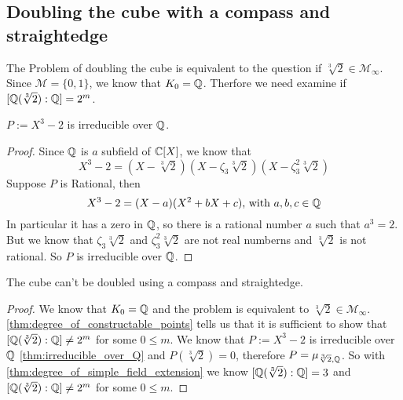 \documentclass{../Proof_layout_PDF/TemplateExercise}
\begin{document}
\subsection{Doubling the cube with a compass and straightedge}
The Problem of doubling the cube is equivalent to the question if $\sqrt[3]{2} \in \mathcal{M}_{\infty}$.
Since $\mathcal{M} = \{0,1\}$, we know that $K_0 = \mathbb{Q}$. Therfore we need examine if $[\mathbb{Q}(\sqrt[3]{2}):\mathbb{Q}] = 2^m$.

\begin{theorem}
    $P := X^3 - 2$ is irreducible over $\mathbb{Q}$.
\label{thm:irreducible_over_Q}
\end{theorem}
\begin{proof}
    Since $\mathbb{Q}$ is $a$ subfield of $\mathbb{C} [X]$, we know that
    \begin{equation*}
        X^3 - 2 = (X - \sqrt[3]{2})(X -\zeta_3 \sqrt[3]{2})(X -\zeta_3^2 \sqrt[3]{2})
    \end{equation*}
    Suppose $P$ is Rational, then
    \begin{equation*}
        X^3 - 2 = (X - a)(X^2 + bX + c)\text{, with } a, b, c \in \mathbb{Q}
    \end{equation*}
    In particular it has a zero in $\mathbb{Q}$, so there is a rational number $a$ such that $a^3 = 2$.\newline
    But we know that $\zeta_3 \sqrt[3]{2}$ and $\zeta_3^2 \sqrt[3]{2}$ are not real numberns and $\sqrt[3]{2}$ is not rational.
    So $P$ is irreducible over $\mathbb{Q}$.
\end{proof}
\begin{theorem}
    The cube can't be doubled using a compass and straightedge.
\end{theorem}
\begin{proof}
    We know that $K_0 = \mathbb{Q}$ and the problem is equivalent to $\sqrt[3]{2} \in \mathcal{M}_{\infty}$.\newline
    \ref{thm:degree_of_constructable_points} tells us that it is sufficient to show that $[\mathbb{Q}(\sqrt[3]{2}):\mathbb{Q}] \ne 2^m$ for some $0 \le m $.
    \newline
    We know that $P := X^3 - 2$ is irreducible over $\mathbb{Q}$ \ref{thm:irreducible_over_Q} and $P(\sqrt[3]{2}) = 0$, therefore $P = \mu_{\sqrt[3]{2},\mathbb{Q}}$.
    So with \ref{thm:degree_of_simple_field_extension} we know $[\mathbb{Q}(\sqrt[3]{2}):\mathbb{Q}] = 3$ and $[\mathbb{Q}(\sqrt[3]{2}):\mathbb{Q}] \ne 2^m$ for some $0 \le m $.
\end{proof}
\end{document}
